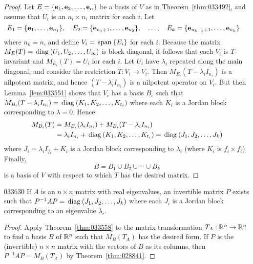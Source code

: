 \begin{proof}
Let $E = \{\textbf{e}_{1}, \textbf{e}_{2}, \dots, \textbf{e}_{n}\}$ be a basis of $V$ as in Theorem~\ref{thm:033492}, and assume that $U_{i}$ is an $n_{i} \times n_{i}$ matrix for each $i$. Let
\begin{equation*}
E_1 = \{\textbf{e}_1, \dots, \textbf{e}_{n_1}\}, \quad E_2 = \{\textbf{e}_{n_1 + 1}, \dots, \textbf{e}_{n_2}\}, \quad \dots, \quad E_k = \{\textbf{e}_{n_{k-1} + 1}, \dots, \textbf{e}_{n_k}\} \quad
\end{equation*}
where $n_{k} = n$, and define $V_{i} = \thinspace\operatorname{span\medspace}\{E_{i}\}$ for each $i$. Because the matrix $M_{E}(T) = \thinspace\operatorname{diag\medspace}(U_{1}, U_{2}, \dots, U_{m})$ is block diagonal, it follows that each $V_{i}$ is $T$-invariant and $M_{E_{i}}(T) = U_{i}$ for each $i$. Let $U_{i}$ have $\lambda_{i}$ repeated along the main diagonal, and consider the restriction $T : V_{i} \to V_{i}$. Then $M_{E_{i}}(T - \lambda_{i}I_{n_{i}})$ is a nilpotent matrix, and hence $(T-\lambda_{i}I_{n_{i}})$ is a nilpotent operator on $V_{i}$. But then Lemma~\ref{lem:033551} shows that $V_{i}$ has a basis $B_{i}$ such that $M_{B_i}(T - \lambda_{i}I_{n_{i}}) = \thinspace\operatorname{diag\medspace}(K_{1}, K_{2}, \dots, K_{t_i})$ where each $K_{i}$ is a Jordan block corresponding to $\lambda = 0$. Hence
\begin{align*}
M_{B_i}(T) &= M_{B_i}(\lambda_iI_{n_i}) + M_{B_i}(T - \lambda_iI_{n_i}) \\
&= \lambda_iI_{n_i} + \thinspace\operatorname{diag\medspace}(K_1, K_2, \dots, K_{t_i}) = \thinspace\operatorname{diag\medspace}(J_1, J_2, \dots, J_k)
\end{align*}
where $J_{i} = \lambda_{i}I_{f_i} + K_{i}$ is a Jordan block corresponding to $\lambda_{i}$ (where $K_{i}$ is $f_{i} \times f_{i}$). Finally, 
\begin{equation*}
B = B_{1} \cup B_{2} \cup \cdots \cup B_{k}
\end{equation*}
is a basis of $V$ with respect to which $T$ has the desired matrix.
\end{proof}

\begin{corollary}{}{033630}
If $A$ is an $n \times n$ matrix with real eigenvalues, an invertible matrix $P$ exists such that $P^{-1}AP = \thinspace\operatorname{diag\medspace}(J_{1}, J_{2}, \dots, J_{k})$ where each $J_{i}$ is a Jordan block corresponding to an eigenvalue $\lambda_{i}$.
\end{corollary}

\begin{proof}
Apply Theorem~\ref{thm:033558} to the matrix transformation $T_{A} : \mathbb{R}^n \to \mathbb{R}^n$ to find a basis $B$ of $\mathbb{R}^n$ such that $M_{B}(T_{A})$ has the desired form. If $P$ is the (invertible) $n \times n$ matrix with the vectors of $B$ as its columns, then $P^{-1}AP = M_{B}(T_{A})$ by Theorem~\ref{thm:028841}.
\end{proof}

